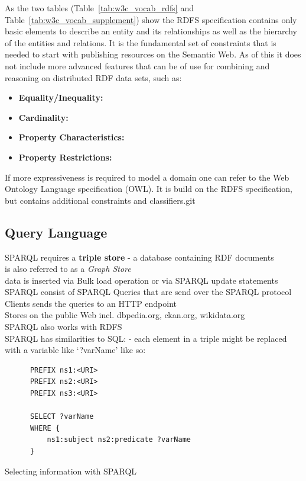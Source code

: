 As the two tables (Table~\ref{tab:w3c_vocab_rdfs} and Table~\ref{tab:w3c_vocab_supplement}) show the \gls{RDFS} specification contains only basic elements to describe an entity and its relationships as well as the hierarchy of the entities and relations. It is the fundamental set of constraints that is needed to start with publishing resources on the Semantic Web. As of this it does not include more advanced features that can be of use for combining and reasoning on distributed \gls{RDF} data sets, such as: \@

\begin{itemize}
	\item \textbf{Equality/Inequality:}
	\item \textbf{Cardinality:}
	\item \textbf{Property Characteristics:}
	\item \textbf{Property Restrictions:}
\end{itemize}

If more expressiveness is required to model a domain one can refer to the Web Ontology Language specification (\gls{OWL}). It is build on the \gls{RDFS} specification, but contains additional constraints and classifiers.git


\subsection{Query Language}
\label{sec:semantic_querylang}

SPARQL requires a \textbf{triple store} - a database containing RDF documents \\
is also referred to as a \textit{Graph Store} \\
data is inserted via Bulk load operation or via SPARQL update statements \\
SPARQL consist of SPARQL Queries that are send over the SPARQL protocol \\
Clients sends the queries to an HTTP endpoint \\
Stores on the public Web incl. dbpedia.org, ckan.org, wikidata.org \\
SPARQL also works with RDFS \\
SPARQL has similarities to SQL:
- each element in a triple might be replaced with a variable like `?varName' like so: \\

\begin{listing}[H]
	\begin{verbatim}
	  PREFIX ns1:<URI>
	  PREFIX ns2:<URI>
	  PREFIX ns3:<URI>

	  SELECT ?varName
	  WHERE {
	      ns1:subject ns2:predicate ?varName
	  }
	\end{verbatim}
\caption{Selecting information with \gls{SPARQL}}
\label{lst:select_sparql}
\end{listing}

